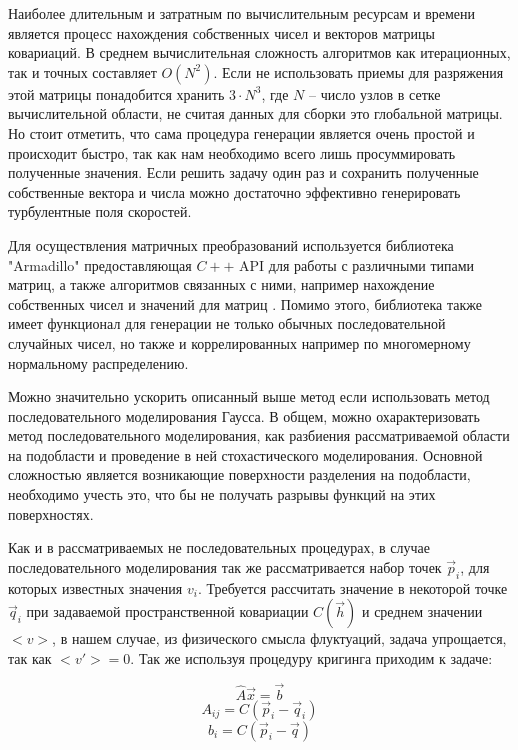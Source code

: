 Наиболее длительным и затратным по вычислительным ресурсам и времени является процесс нахождения собственных чисел и векторов матрицы ковариаций. В среднем вычислительная сложность алгоритмов как итерационных, так и точных составляет $O(N^2)$. Если не использовать приемы для разряжения этой матрицы понадобится хранить $3 \cdot N^3$, где $N$ -- число узлов в сетке вычислительной области, не считая данных для сборки это глобальной матрицы. Но стоит отметить, что сама процедура генерации является очень простой и происходит быстро, так как нам необходимо всего лишь просуммировать полученные значения. Если решить задачу один раз и сохранить полученные собственные вектора и числа можно достаточно эффективно генерировать турбулентные поля скоростей.

Для осуществления матричных преобразований используется библиотека "Armadillo" предоставляющая $C++$ API для работы с различными типами матриц, а также алгоритмов связанных с ними, например нахождение собственных чисел и значений для матриц \cite{sanderson2016armadillo, sanderson2018user}. Помимо этого, библиотека также имеет функционал для генерации не только обычных последовательной случайных чисел, но также и коррелированных например по многомерному нормальному распределению.

Можно значительно ускорить описанный выше метод если использовать метод последовательного моделирования Гаусса. В общем, можно охарактеризовать метод последовательного моделирования, как разбиения рассматриваемой области на подобласти и проведение в ней стохастического моделирования. Основной сложностью является возникающие поверхности разделения на подобласти, необходимо учесть это, что бы не получать разрывы функций на этих поверхностях. 

Как и в рассматриваемых не последовательных процедурах, в случае последовательного моделирования так же рассматривается набор точек $\vec p_i$, для которых известных значения $v_i$. Требуется рассчитать значение в некоторой точке $\vec q_i$ при задаваемой пространственной ковариации $C(\vec h)$ и среднем значении $<v>$, в нашем случае, из физического смысла флуктуаций, задача упрощается, так как $<v'>=0$. Так же используя процедуру кригинга приходим к задаче:

\begin{equation}
    \label{eq:kriging_seq_1}
    \hat{A} \vec x = \vec b
\end{equation}
\begin{equation}
    \label{eq:kriging_seq_2}
    A_{ij} = C(\vec p_i - \vec q_i)
\end{equation}
\begin{equation}
    \label{eq:kriging_seq_3}
    b_i = C(\vec p_i - \vec q)
\end{equation}


